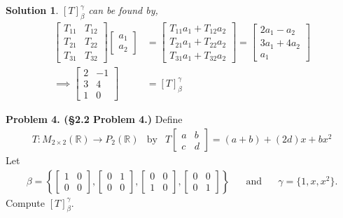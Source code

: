 \documentclass[leqno]{article}
\theoremstyle{nonumberplain}
\newtheorem{solution}{Solution}
\begin{document}
\begin{solution}
$[T]_\beta^\gamma$ can be found by,
\begin{align*}
\begin{bmatrix}
T_{11} & T_{12}\\
T_{21} & T_{22}\\
T_{31} & T_{32}
\end{bmatrix}
\begin{bmatrix}
a_1\\
a_2
\end{bmatrix}
&=
\begin{bmatrix}
T_{11}a_1+T_{12}a_2\\
T_{21}a_1+T_{22}a_2\\
T_{31}a_1+T_{32}a_2
\end{bmatrix}
=
\begin{bmatrix}
2a_1-a_2\\
3a_1+4a_2\\
a_1
\end{bmatrix}\\
\implies
\begin{bmatrix}
2 & -1\\
3 & 4\\
1 & 0
\end{bmatrix}
&= [T]_\beta^\gamma
\end{align*}
\end{solution}

\pagebreak





\noindent\textbf{Problem 4. (\S 2.2 Problem 4.)}  Define
\begin{align*}
T\colon M_{2\times 2}(\mathbb{R})\to P_2(\mathbb{R}) &\textrm{by} &T
\begin{bmatrix}
a & b\\
c & d
\end{bmatrix}
=(a+b)+(2d)x+bx^2
\end{align*}
Let
\begin{align*}
\beta = \left\{
\begin{bmatrix}
1 & 0\\
0 & 0
\end{bmatrix},
\begin{bmatrix}
0 & 1\\
0 & 0
\end{bmatrix},
\begin{bmatrix}
0 & 0\\
1 & 0
\end{bmatrix},
\begin{bmatrix}
0 & 0\\
0 & 1
\end{bmatrix}\right\} \textrm{~~~~~and~~~~~} \gamma=\{1,x,x^2\}.
\end{align*}
Compute $[T]_\beta^\gamma$.
\end{document}

